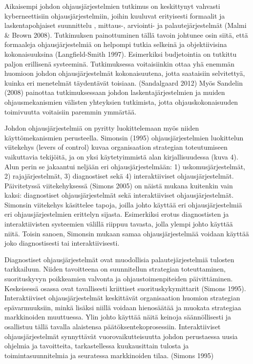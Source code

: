 \documentclass[12pt,a4paper,oneside,pdftex]{report}
\begin{document}
Aikaisempi johdon ohjausjärjestelmien tutkimus on keskittynyt vahvasti kyberneettisiin ohjausjärjestelmiin, joihin kuuluvat erityisesti formaalit ja laskentapohjaiset suunnittelu ,  mittaus-, arviointi- ja palautejärjestelmät (Malmi & Brown 2008). Tutkimuksen painottuminen tällä tavoin johtunee osin siitä, että formaaleja ohjausjärjestelmiä on helpompi tutkia selkeinä ja objektiivisina kokonaisuuksina (Langfield-Smith 1997). Esimerkiksi budjetointia on tutkittu paljon erillisenä systeeminä. Tutkimuksessa voitaisiinkin ottaa yhä enemmän huomioon johdon ohjausjärjestelmät kokonaisuutena, jotta saataisiin selvitettyä, kuinka eri menetelmät täydentävät toisiaan. (Sandalgaard 2012) Myös Sandelin (2008) painottaa tutkimuksessaan johdon laskentajärjestelmien ja muiden ohjausmekanismien välisten yhteyksien tutkimista, jotta ohjauskokonaisuuden toimivuutta voitaisiin paremmin ymmärtää. 

Johdon ohjausjärjestelmiä on pyritty luokittelemaan myös niiden käyttömekanismien perusteella. Simonsin (1995) ohjausjärjestelmien luokittelun viitekehys (levers of control) kuvaa organisaation strategian toteutumiseen vaikuttavia tekijöitä, ja on yksi käytetyimmistä alan kirjallisuudessa (kuva 4). Alun perin se jakaantui neljään eri ohjausjärjestelmään: 1) uskomusjärjestelmät, 2) rajajärjestelmät, 3) diagnostiset sekä 4) interaktiiviset ohjausjärjestelmät. Päivitetyssä viitekehyksessä (Simons 2005) on näistä mukana kuitenkin vain kaksi: diagnostiset ohjausjärjestelmät sekä interaktiiviset ohjausjärjestelmät. Simonsin viitekehys käsittelee tapoja, joilla johto käyttää eri ohjausjärjestelmiä eri ohjausjärjestelmien erittelyn sijasta. Esimerkiksi erotus diagnostisten ja interaktiivisten systeemien välillä riippuu tavasta, jolla ylempi johto käyttää niitä. Toisin sanoen, Simonsin mukaan samaa ohjausjärjestelmää voidaan käyttää joko diagnostisesti tai interaktiivisesti.

Diagnostiset ohjausjärjestelmät ovat muodollisia palautejärjestelmiä tulosten tarkkailuun. Niiden tavoitteena on suunnitellun strategian toteuttaminen, suorituskyvyn poikkeamien valvonta ja ohjaustoimenpiteiden päivittäminen. Keskeisessä osassa ovat tavallisesti kriittiset suorituskykymittarit (Simons 1995). Interaktiiviset ohjausjärjestelmät keskittävät organisaation huomion strategian epävarmuuksiin, minkä lisäksi niillä voidaan hienosäätää ja muokata strategiaa markkinoiden muuttuessa. Ylin johto käyttää näitä keinoja säännöllisesti ja osallistuu tällä tavalla alaistensa päätöksentekoprosessiin. Interaktiiviset ohjausjärjestelmät synnyttävät vuorovaikutteisuutta johdon perustaessa uusia ohjelmia ja tavoitteita, tarkastellessa kuukausittain tulosta ja toimintasuunnitelmia ja seuratessa markkinoiden tilaa. (Simons 1995)
\end{document}
